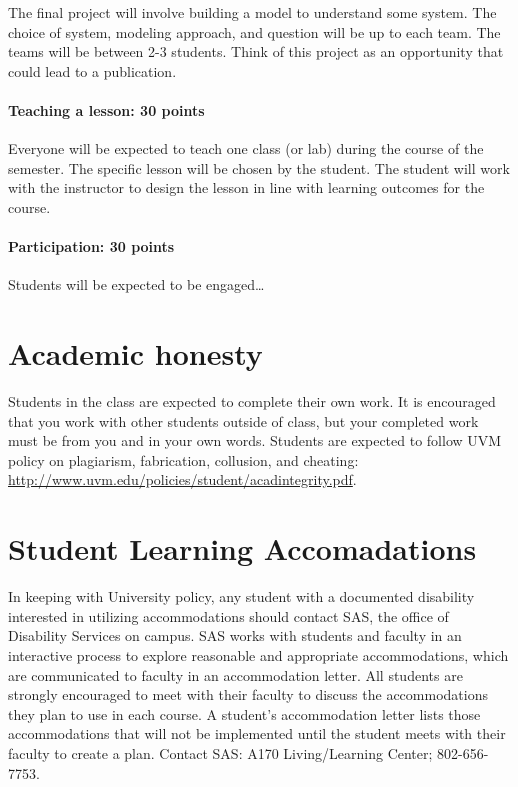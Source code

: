 \documentclass[12pt,]{article}
\let\oldparagraph\paragraph
\renewcommand{\paragraph}[1]{\oldparagraph{#1}\mbox{}}
\begin{document}
The final project will involve building a model to understand some
system. The choice of system, modeling approach, and question will be up
to each team. The teams will be between 2-3 students. Think of this
project as an opportunity that could lead to a publication.

\paragraph{Teaching a lesson: 30
points}\label{teaching-a-lesson-30-points}

Everyone will be expected to teach one class (or lab) during the course
of the semester. The specific lesson will be chosen by the student. The
student will work with the instructor to design the lesson in line with
learning outcomes for the course.

\paragraph{Participation: 30 points}\label{participation-30-points}

Students will be expected to be engaged\ldots{}

\section{Academic honesty}\label{academic-honesty}

Students in the class are expected to complete their own work. It is
encouraged that you work with other students outside of class, but your
completed work must be from you and in your own words. Students are
expected to follow UVM policy on plagiarism, fabrication, collusion, and
cheating: \url{http://www.uvm.edu/policies/student/acadintegrity.pdf}.

\section{Student Learning
Accomadations}\label{student-learning-accomadations}

In keeping with University policy, any student with a documented
disability interested in utilizing accommodations should contact SAS,
the office of Disability Services on campus. SAS works with students and
faculty in an interactive process to explore reasonable and appropriate
accommodations, which are communicated to faculty in an accommodation
letter. All students are strongly encouraged to meet with their faculty
to discuss the accommodations they plan to use in each course. A
student's accommodation letter lists those accommodations that will not
be implemented until the student meets with their faculty to create a
plan. Contact SAS: A170 Living/Learning Center; 802-656-7753.
\end{document}
